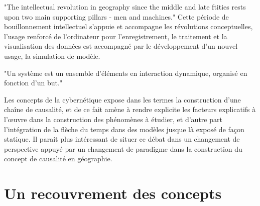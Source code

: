 {%
"The intellectual revolution in geography since the middle and late ftities rests upon two main supporting pillars - men and machines." \autocite{Gould1970} Cette période de bouillonnement intellectuel s'appuie et accompagne les révolutions conceptuelles, l'usage renforcé de l'ordinateur pour l'enregistrement, le traitement et la visualisation des données est accompagné par le développement d'un nouvel usage, la simulation de modèle.


"Un système est un ensemble d'éléments en interaction dynamique, organisé en fonction d'un but." \autocite{Rosnay1975}

Les concepts de la cybernétique expose dans les termes la construction d'une chaîne de causalité, et de ce fait amène à rendre explicite les facteurs explicatifs à l’œuvre dans la construction des phénomènes à étudier, et d'autre part l'intégration de la flèche du temps dans des modèles jusque là exposé de façon statique. Il parait plus intéressant de situer ce débat dans un changement de perspective appuyé par un changement de paradigme dans la construction du concept de causalité en géographie. 






\section{Un recouvrement des concepts}
\label{ssubsec:recouvrement_concept}

}
